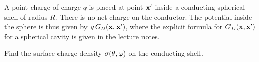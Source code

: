 \newcommand{\lap}{\nabla^2}
\newcommand{\vF}{\vec{F}}
\newcommand{\nabx}{\nabla_{\!x}}
\newcommand{\absxp}{\abs{\vx'}}
\newcommand{\nh}{\vec{\hat{n}}}
\newcommand{\rh}{\vec{\hat{r}}}
\newcommand{\Gd}{G_D}
\newcommand{\Gdxxp}{\Gd(\vx,\vx')}

\begin{statement}{}
	A point charge of charge $q$ is placed at point $\mathbf{x}'$ inside a conducting spherical shell of radius $R$.  There is no net charge on the conductor.  The potential inside the sphere is thus given by $q \, \Gdxxp$, where the explicit formula for $\Gdxxp$ for a spherical cavity is given in the lecture notes.
\end{statement}

\begin{problem}
	Find the surface charge density $\sigma(\theta, \varphi)$ on the conducting shell.
\end{problem}


